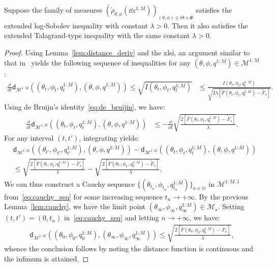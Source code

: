 \begin{theorem}\label{thm:xLSI_implies_xTalagrand}
    Suppose the family of measures $(\tilde{\rho}_{\theta,\phi}(\dd z^{1:M}))_{(\theta,\phi)\in\Theta\times\Phi}$ satisfies the extended log-Sobolev inequality with constant $\lambda>0$. Then it also satisfies the extended Talagrand-type inequality with the same constant $\lambda>0$.
\end{theorem}
\begin{proof}
    Using Lemma~\ref{lem:distance_deriv} and the \gls*{xlsi}, an argument similar to that in~\citet[Theorem 4]{caprioerrorboundsparticle2024} yields the following sequence of inequalities for any $(\theta, \phi, q^{1:M}) \in \mathcal{M}^{1:M}$:
    \begin{align*}
        \frac{\dd}{\dd t} \mathsf{d}_{\mathcal{M}^{1:M}}((\theta_t, \phi_t, q_t^{1:M}), (\theta, \phi, q^{1:M})) \leq \sqrt{I(\theta_t, \phi_t, q_t^{1:M})} &\leq \frac{I(\theta_t, \phi_t, q_t^{1:M})}{\sqrt{2\lambda[\tilde{F}(\theta_t, \phi_t, q_t^{1:M}) - \tilde{F}_\star]}}. 
    \end{align*}
    Using de Bruijn's identity~\eqref{eq:de_bruijin}, we have:
    \begin{align*}
        \frac{\dd}{\dd t} \mathsf{d}_{\mathcal{M}^{1:M}}((\theta_t, \phi_t, q_t^{1:M}), (\theta, \phi, q^{1:M})) &\leq -\frac{\dd}{\dd t} \sqrt{\frac{2[\tilde{F}(\theta_t, \phi_t, q_t^{1:M}) - \tilde{F}_\star]}{\lambda}}.
    \end{align*}
    For any interval $(t,t')$, integrating yields:
    \begin{align}
        &\mathsf{d}_{\mathcal{M}^{1:M}}((\theta_{t'}, \phi_{t'}, q_{t'}^{1:M}), (\theta, \phi, q^{1:M})) - \mathsf{d}_{\mathcal{M}^{1:M}}((\theta_t, \phi_t, q_t^{1:M}), (\theta, \phi, q^{1:M})) \nonumber \\
        &\leq \sqrt{\frac{2[\tilde{F}(\theta_t, \phi_t, q_t^{1:M}) - \tilde{F}_\star]}{\lambda}} - \sqrt{\frac{2[\tilde{F}(\theta_{t'}, \phi_{t'}, q_{t'}^{1:M}) - \tilde{F}_\star]}{\lambda}}.\label{eq:cauchy_seq}
    \end{align}
    We can thus construct a Cauchy sequence $\{(\theta_{t_n}, \phi_{t_n}, q_{t_n}^{1:M})\}_{n\in \mathbb{N}}$ in $\mathcal{M}^{1:M,1}$ from~\eqref{eq:cauchy_seq} for some increasing sequence $t_n \to +\infty$. By the previous Lemma~\ref{lem:cauchy}, we have the limit point $(\theta_\infty, \phi_\infty, q_\infty^{1:M}) \in \mathcal{M}_\star$. Setting $(t,t')=(0,t_n)$ in~\eqref{eq:cauchy_seq} and letting $n \to +\infty$, we have:
    \begin{align*}
        \mathsf{d}_{\mathcal{M}^{1:M}}((\theta_0, \phi_0, q_0^{1:M}), (\theta_\infty, \phi_\infty, q_\infty^{1:M})) \leq \sqrt{\frac{2[\tilde{F}(\theta_0, \phi_0, q_0^{1:M}) - \tilde{F}_\star]}{\lambda}},
    \end{align*}
    whence the conclusion follows by noting the distance function is continuous and the infimum is attained.
\end{proof}

